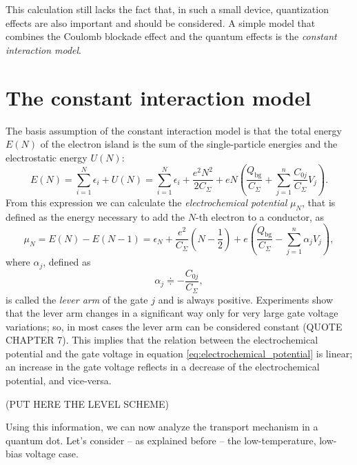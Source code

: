 \documentclass[a4paper,twoside,11pt]{book}
\begin{document}
This calculation still lacks the fact that, in such a small device, quantization effects are also important and should be considered. A simple model that combines the Coulomb blockade effect and the quantum effects is the \emph{constant interaction model}.

\section{The constant interaction model}
The basis assumption of the constant interaction model is that the total energy $E(N)$ of the electron island is the sum of the single-particle energies and the electrostatic energy $U(N)$:
\begin{equation}
	E(N) = \sum_{i=1}^{N}\epsilon_i + U(N) = \sum_{i=1}^{N}\epsilon_i + \frac{e^2N^2}{2C_{\Sigma}} + eN\left( \frac{Q_{\text{bg}}}{C_{\Sigma}} + \sum_{j=1}^{n}\frac{C_{0j}}{C_{\Sigma}}V_j \right).
\end{equation}
From this expression we can calculate the \emph{electrochemical potential} $\mu_N$, that is defined as the energy necessary to add the $N$-th electron to a conductor, as
\begin{equation}
	\mu_N 
	= E(N) - E(N-1) 
	=  \epsilon_N + \frac{e^2}{C_{\Sigma}}\left(N-\frac{1}{2}\right) + e\left( \frac{Q_{\text{bg}}}{C_{\Sigma}} - \sum_{j=1}^{n}\alpha_jV_j \right),
	\label{eq:electrochemical_potential}
\end{equation}
where $\alpha_j$, defined as
\begin{equation}
	\alpha_j \doteqdot - \frac{C_{0j}}{C_{\Sigma}},
\end{equation}
is called the \emph{lever arm} of the gate $j$ and is always positive. Experiments show that the lever arm changes in a significant way only for very large gate voltage variations; so, in most cases the lever arm can be considered constant (QUOTE CHAPTER 7). This implies that the relation between the electrochemical potential and the gate voltage in equation \eqref{eq:electrochemical_potential} is linear; an increase in the gate voltage reflects in a decrease of the electrochemical potential, and vice-versa.

(PUT HERE THE LEVEL SCHEME)

Using this information, we can now analyze the transport mechanism in a quantum dot. Let's consider -- as explained before -- the low-temperature, low-bias voltage case.
\end{document}
